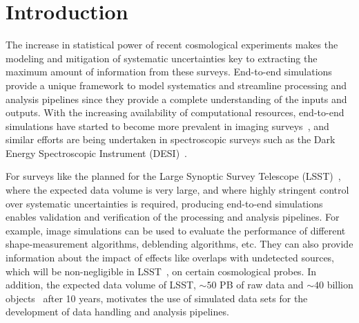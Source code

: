\documentclass[\docopts]{\docclass}
\begin{document}
\begin{abstract}


\end{abstract}



\section{Introduction}
\label{sec:intro}
The increase in statistical power of recent cosmological experiments makes the modeling and mitigation of systematic uncertainties key to extracting the maximum amount of information from these surveys. End-to-end simulations~\citep{Brun:118715, AGOSTINELLI2003250, 2006JHEP...05..026S} provide a unique framework to
model systematics and streamline processing and analysis pipelines since they provide a complete understanding of the inputs and outputs. With the increasing availability of computational resources, end-to-end simulations have started to become more prevalent in imaging surveys~\citep{2016ApJ...817...25B}, and similar efforts are being undertaken in spectroscopic surveys such as the Dark Energy Spectroscopic Instrument (DESI)~\citep{2016arXiv161100036D}.

For surveys like the planned for the Large Synoptic Survey Telescope (LSST)~\citep{Overview}, where the expected data volume is very large, and where highly stringent control over systematic uncertainties is required, producing end-to-end simulations enables validation and verification of the processing and analysis pipelines. For example, image simulations can be used to evaluate the performance of different shape-measurement algorithms, deblending algorithms, etc. They can also provide information about the impact of effects like overlaps with undetected sources, which will be non-negligible in LSST~\citep{2016ApJ...816...11D}, on certain cosmological probes. In addition, the expected data volume of LSST, $\sim 50$ PB of raw data and $\sim 40$ billion objects~\citep{Overview} after 10 years, motivates the use of simulated data sets for the development of data handling and analysis pipelines.  
\end{document}
